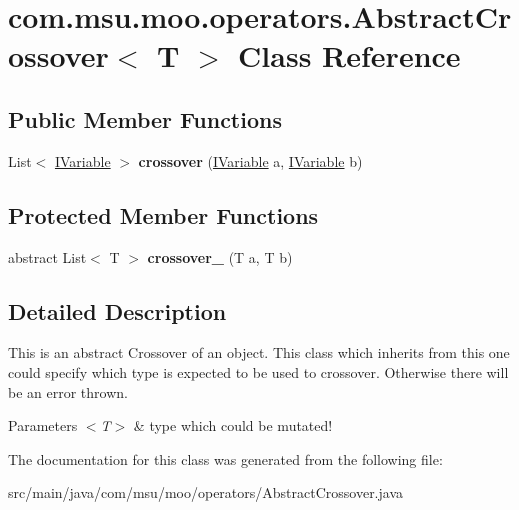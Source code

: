 \hypertarget{classcom_1_1msu_1_1moo_1_1operators_1_1AbstractCrossover_3_01T_01_4}{\section{com.\-msu.\-moo.\-operators.\-Abstract\-Crossover$<$ T $>$ Class Reference}
\label{classcom_1_1msu_1_1moo_1_1operators_1_1AbstractCrossover_3_01T_01_4}
}
\subsection*{Public Member Functions}
\begin{DoxyCompactItemize}
\item 
\hypertarget{classcom_1_1msu_1_1moo_1_1operators_1_1AbstractCrossover_3_01T_01_4_a8b517aa8452e5962e751af3392b79538}{List$<$ \hyperlink{interfacecom_1_1msu_1_1moo_1_1model_1_1interfaces_1_1IVariable}{I\-Variable} $>$ {\bfseries crossover} (\hyperlink{interfacecom_1_1msu_1_1moo_1_1model_1_1interfaces_1_1IVariable}{I\-Variable} a, \hyperlink{interfacecom_1_1msu_1_1moo_1_1model_1_1interfaces_1_1IVariable}{I\-Variable} b)}\label{classcom_1_1msu_1_1moo_1_1operators_1_1AbstractCrossover_3_01T_01_4_a8b517aa8452e5962e751af3392b79538}

\end{DoxyCompactItemize}
\subsection*{Protected Member Functions}
\begin{DoxyCompactItemize}
\item 
\hypertarget{classcom_1_1msu_1_1moo_1_1operators_1_1AbstractCrossover_3_01T_01_4_a2e78a307f6c18698927da579acdfbfbf}{abstract List$<$ T $>$ {\bfseries crossover\-\_\-} (T a, T b)}\label{classcom_1_1msu_1_1moo_1_1operators_1_1AbstractCrossover_3_01T_01_4_a2e78a307f6c18698927da579acdfbfbf}

\end{DoxyCompactItemize}


\subsection{Detailed Description}
This is an abstract Crossover of an object. This class which inherits from this one could specify which type is expected to be used to crossover. Otherwise there will be an error thrown.


\begin{DoxyParams}{Parameters}
{\em $<$\-T$>$} & type which could be mutated! \\
\hline
\end{DoxyParams}


The documentation for this class was generated from the following file\-:\begin{DoxyCompactItemize}
\item 
src/main/java/com/msu/moo/operators/Abstract\-Crossover.\-java\end{DoxyCompactItemize}
